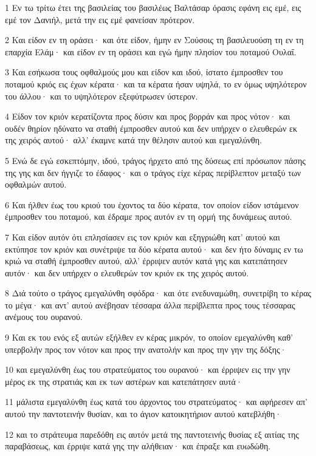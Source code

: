 \par 1 Εν τω τρίτω έτει της βασιλείας του βασιλέως Βαλτάσαρ όρασις εφάνη εις εμέ, εις εμέ τον Δανιήλ, μετά την εις εμέ φανείσαν πρότερον.
\par 2 Και είδον εν τη οράσει· και ότε είδον, ήμην εν Σούσοις τη βασιλευούση τη εν τη επαρχία Ελάμ· και είδον εν τη οράσει και εγώ ήμην πλησίον του ποταμού Ουλαΐ.
\par 3 Και εσήκωσα τους οφθαλμούς μου και είδον και ιδού, ίστατο έμπροσθεν του ποταμού κριός εις έχων κέρατα· και τα κέρατα ήσαν υψηλά, το εν όμως υψηλότερον του άλλου· και το υψηλότερον εξεφύτρωσεν ύστερον.
\par 4 Είδον τον κριόν κερατίζοντα προς δύσιν και προς βορράν και προς νότον· και ουδέν θηρίον ηδύνατο να σταθή έμπροσθεν αυτού και δεν υπήρχεν ο ελευθερών εκ της χειρός αυτού· αλλ' έκαμνε κατά την θέλησιν αυτού και εμεγαλύνθη.
\par 5 Ενώ δε εγώ εσκεπτόμην, ιδού, τράγος ήρχετο από της δύσεως επί πρόσωπον πάσης της γης και δεν ήγγιζε το έδαφος· και ο τράγος είχε κέρας περίβλεπτον μεταξύ των οφθαλμών αυτού.
\par 6 Και ήλθεν έως του κριού του έχοντος τα δύο κέρατα, τον οποίον είδον ιστάμενον έμπροσθεν του ποταμού, και έδραμε προς αυτόν εν τη ορμή της δυνάμεως αυτού.
\par 7 Και είδον αυτόν ότι επλησίασεν εις τον κριόν και εξηγριώθη κατ' αυτού και εκτύπησε τον κριόν και συνέτριψε τα δύο κέρατα αυτού· και δεν ήτο δύναμις εν τω κριώ να σταθή έμπροσθεν αυτού, αλλ' έρριψεν αυτόν κατά γης και κατεπάτησεν αυτόν· και δεν υπήρχεν ο ελευθερών τον κριόν εκ της χειρός αυτού.
\par 8 Διά τούτο ο τράγος εμεγαλύνθη σφόδρα· και ότε ενεδυναμώθη, συνετρίβη το κέρας το μέγα· και αντ' αυτού ανέβησαν τέσσαρα άλλα περίβλεπτα προς τους τέσσαρας ανέμους του ουρανού.
\par 9 Και εκ του ενός εξ αυτών εξήλθεν εν κέρας μικρόν, το οποίον εμεγαλύνθη καθ' υπερβολήν προς τον νότον και προς την ανατολήν και προς την γην της δόξης·
\par 10 και εμεγαλύνθη έως του στρατεύματος του ουρανού· και έρριψεν εις την γην μέρος εκ της στρατιάς και εκ των αστέρων και κατεπάτησεν αυτά·
\par 11 μάλιστα εμεγαλύνθη έως κατά του άρχοντος του στρατεύματος· και αφήρεσεν απ' αυτού την παντοτεινήν θυσίαν, και το άγιον κατοικητήριον αυτού κατεβλήθη·
\par 12 και το στράτευμα παρεδόθη εις αυτόν μετά της παντοτεινής θυσίας εξ αιτίας της παραβάσεως, και έρριψε κατά γης την αλήθειαν· και έπραξε και ευωδώθη.
